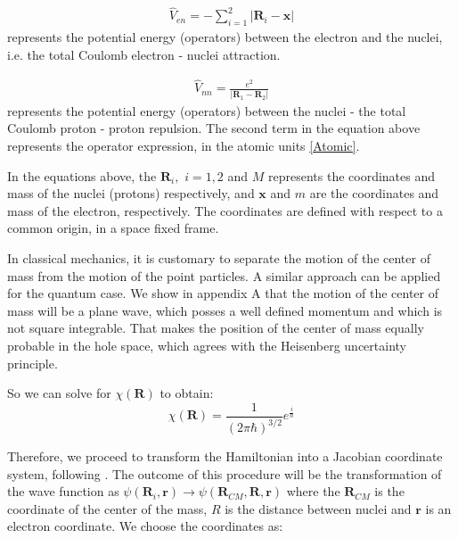 \begin{equation}
\begin{split}
 \hat{V}_{en} = -\sum_{i=1}^2{\left|\mathbf{R}_i - \mathbf{x}\right| }   
\end{split}
\end{equation}
represents the potential energy (operators) between the electron and the nuclei, i.e. the total Coulomb electron - nuclei attraction.

\begin{equation}
\begin{split}
 \hat{V}_{nn} =  \frac{e^2}{\left|\mathbf{R}_1 - \mathbf{R}_2\right| } 
\end{split}
\end{equation}
represents the potential energy (operators) between the nuclei - the total Coulomb proton - proton repulsion. The second term in the equation above represents the operator expression, in the atomic units \eqref{Atomic}.

In the equations above, the $ \mathbf{R}_i,\,\, i = 1,2 $ and $ M $ represents the coordinates and mass of the nuclei (protons) respectively, and $ \mathbf{x} $ and $ m $ are the coordinates and mass of the electron, respectively. The coordinates are defined with respect to a common origin, in a space fixed frame.

In classical mechanics, it is customary to separate the motion of the center of mass from the motion of the point particles. A similar approach can be applied for the quantum case. We show in appendix A that the motion of the center of mass will be a plane wave, which posses a well defined momentum and which is not square integrable. That makes the position of the center of mass equally probable in the hole space, which agrees with the Heisenberg uncertainty principle.

So we can solve for $ \chi(\mathbf{R}) $ to obtain:
\begin{equation}
\chi(\mathbf{R}) = \frac{1}{(2\pi\hbar)^{3/2}}e^{\frac{i}{\hbar}}
\end{equation}

Therefore, we proceed to transform the Hamiltonian into a Jacobian coordinate system, following \cite{ZygelmanDalgarno1}. The outcome of this procedure will be the transformation of the wave function as $\psi(\mathbf{R}_i, \mathbf{r}) \rightarrow \psi(\mathbf{R}_{CM}, \mathbf{R}, \mathbf{r}) $ where the $ \mathbf{R}_{CM} $ is the coordinate of the center of the mass, $ R $ is the distance between nuclei and $ \mathbf{r} $ is an electron coordinate.
We choose the coordinates as:

